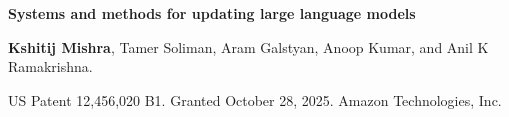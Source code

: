 \textbf{Systems and methods for updating large language models}\par
\textbf{Kshitij Mishra}, Tamer Soliman, Aram Galstyan, Anoop Kumar, and Anil K Ramakrishna.\par
US Patent 12,456,020 B1. Granted October 28, 2025. Amazon Technologies, Inc.\enspace{}
